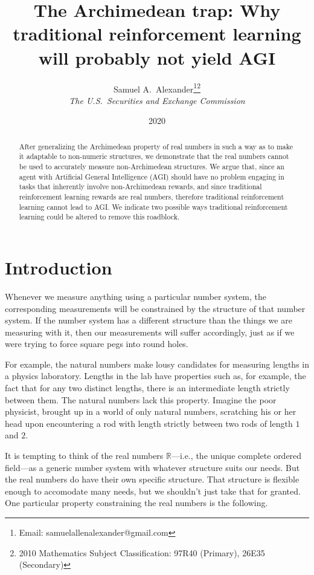 \documentclass[reqno]{article}
\theoremstyle{definition}
\begin{document}
\title{The Archimedean trap: Why
traditional reinforcement learning will probably not yield AGI}

\author{Samuel A.~Alexander\thanks{Email:
samuelallenalexander@gmail.com}\hphantom{*}\footnote{2010 Mathematics 
Subject Classification: 97R40 (Primary), 26E35 (Secondary)}\\
\emph{The U.S.\ Securities and Exchange Commission}}
\date{2020}
\maketitle

\begin{abstract}
    After generalizing the Archimedean property of real numbers in such a
    way as to make it adaptable to non-numeric structures, we demonstrate
    that the real numbers cannot be used to accurately measure non-Archimedean
    structures. We argue that, since an agent with Artificial General
    Intelligence (AGI) should have no problem engaging in tasks that inherently
    involve non-Archimedean rewards, and since traditional reinforcement
    learning rewards are real numbers, therefore traditional reinforcement
    learning cannot lead to AGI. We indicate two possible ways traditional
    reinforcement learning could be altered to remove this roadblock.
\end{abstract}

\section{Introduction}

Whenever we measure anything using a particular number system, the
corresponding measurements will be constrained by the structure of that
number system. If the number system has a different structure than
the things we are measuring with it, then our
measurements will suffer accordingly, just as if we were trying to
force square pegs into round holes.

For example, the natural numbers make lousy candidates for measuring
lengths in a physics laboratory. Lengths in the lab have
properties such as, for example, the fact that for any two distinct
lengths, there is an intermediate length strictly between them.
The natural numbers lack this property. Imagine the poor physicist,
brought up in a world of only natural numbers, scratching his or her
head upon encountering a rod with length strictly between two rods
of length $1$ and $2$.

It is tempting to think of the real numbers $\mathbb R$---i.e., the unique
complete ordered field---as a generic number system with whatever
structure suits our needs. But the
real numbers do have their own specific structure. That structure is
flexible enough to accomodate many needs, but we shouldn't just
take that for granted. One particular property constraining the real numbers
is the following.
\end{document}
